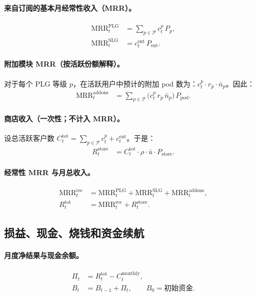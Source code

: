 \documentclass[11pt, a4paper, oneside]{article}
\begin{document}
\paragraph{来自订阅的基本月经常性收入（MRR）。}
\begin{align}
\mathrm{MRR}^{\mathrm{PLG}}_t &= \sum_{p \in \mathcal{P}} c^p_t \, P_p,\\
\mathrm{MRR}^{\mathrm{SLG}}_t &= c^{\mathrm{ent}}_t \, P_{\mathrm{ent}}.
\end{align}

\paragraph{附加模块 MRR（按活跃份额解释）。}
对于每个 PLG 等级 $p$，在活跃用户中预计的附加 pod 数为：$c^p_t \cdot r_p \cdot \bar{n}_p$。因此：
\begin{align}
\mathrm{MRR}^{\mathrm{addons}}_t 
  &= \sum_{p \in \mathcal{P}} \bigl(c^p_t \, r_p \, \bar{n}_p\bigr)\, P_{\mathrm{pod}}.
\end{align}

\paragraph{商店收入（一次性；不计入 MRR）。}
设总活跃客户数 $C^{\mathrm{tot}}_t = \sum_{p \in \mathcal{P}} c^p_t + c^{\mathrm{ent}}_t$。于是：
\begin{align}
R^{\mathrm{store}}_t 
  &= C^{\mathrm{tot}}_t \cdot \rho \cdot \bar{u} \cdot P_{\mathrm{store}}.
\end{align}

\paragraph{经常性 MRR 与月总收入。}
\begin{align}
\mathrm{MRR}^{\mathrm{rec}}_t 
  &= \mathrm{MRR}^{\mathrm{PLG}}_t + \mathrm{MRR}^{\mathrm{SLG}}_t + \mathrm{MRR}^{\mathrm{addons}}_t,\\
R^{\mathrm{tot}}_t 
  &= \mathrm{MRR}^{\mathrm{rec}}_t + R^{\mathrm{store}}_t.
\end{align}

\subsection{损益、现金、烧钱和资金续航}
\paragraph{月度净结果与现金余额。}
\begin{align}
\Pi_t &= R^{\mathrm{tot}}_t - C^{\mathrm{monthly}}_t,\\
B_t &= B_{t-1} + \Pi_t, \qquad B_0 = \text{初始资金}.
\end{align}
\end{document}
